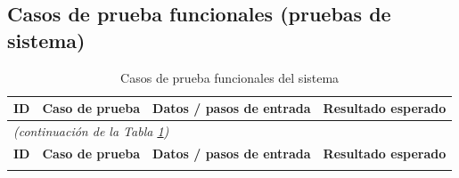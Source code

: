 \documentclass[12pt,a4paper]{article}
\begin{document}
\subsection{Casos de prueba funcionales (pruebas de sistema)}

\begin{longtable}{p{1.2cm} p{3.6cm} p{4.4cm} p{3.9cm}}
\caption{Casos de prueba funcionales del sistema}
\label{tab:cp} \\
\toprule
\bfseries ID & \bfseries Caso de prueba & \bfseries Datos / pasos de entrada & \bfseries Resultado esperado \\
\midrule
\endfirsthead
\multicolumn{4}{l}{\small\textit{(continuación de la Tabla \ref{tab:cp})}}\\
\toprule
\bfseries ID & \bfseries Caso de prueba & \bfseries Datos / pasos de entrada & \bfseries Resultado esperado \\
\midrule
\endhead
\bottomrule
\endfoot


\end{longtable}
\end{document}
